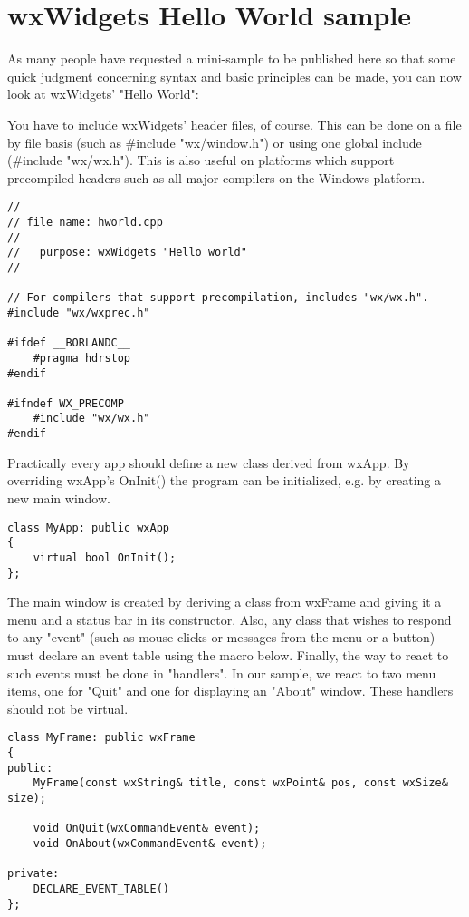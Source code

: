 \section{wxWidgets Hello World sample}\label{helloworld}

As many people have requested a mini-sample to be published here
so that some quick judgment concerning syntax
and basic principles can be made, you can now look at wxWidgets'
"Hello World":

You have to include wxWidgets' header files, of course. This can
be done on a file by file basis (such as \#include "wx/window.h")
or using one global include (\#include "wx/wx.h"). This is
also useful on platforms which support precompiled headers such
as all major compilers on the Windows platform.

\begin{verbatim}
//
// file name: hworld.cpp
//
//   purpose: wxWidgets "Hello world"
//

// For compilers that support precompilation, includes "wx/wx.h".
#include "wx/wxprec.h"

#ifdef __BORLANDC__
    #pragma hdrstop
#endif

#ifndef WX_PRECOMP
    #include "wx/wx.h"
#endif
\end{verbatim}

Practically every app should define a new class derived from wxApp.
By overriding wxApp's OnInit() the program can be initialized,
e.g. by creating a new main window. 

\begin{verbatim}
class MyApp: public wxApp
{
    virtual bool OnInit();
};
\end{verbatim}

The main window is created by deriving a class from wxFrame and 
giving it a menu and a status bar in its constructor. Also, any class
that wishes to respond to any "event" (such as mouse clicks or
messages from the menu or a button) must declare an event table 
using the macro below. Finally, the way to react to such events 
must be done in "handlers". In our sample, we react to two menu items, 
one for "Quit" and one for displaying an "About" window. These
handlers should not be virtual.

\begin{verbatim}
class MyFrame: public wxFrame
{
public:
    MyFrame(const wxString& title, const wxPoint& pos, const wxSize& size);

    void OnQuit(wxCommandEvent& event);
    void OnAbout(wxCommandEvent& event);

private:
    DECLARE_EVENT_TABLE()
};
\end{verbatim}

